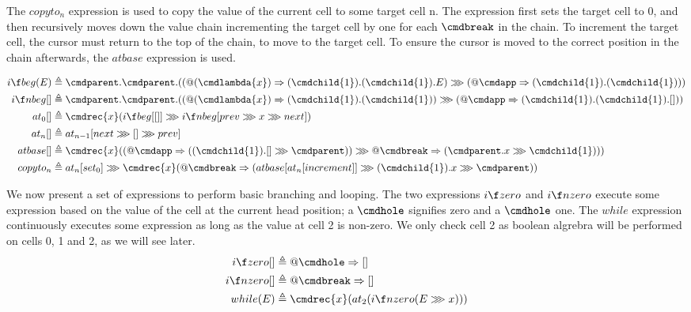 The $copyto_n$ expression is used to copy the value of the current cell to some target cell n. The expression first sets the target cell to 0, and then recursively moves down the value chain incrementing the target cell by one for each $\cmdbreak$ in the chain. To increment the target cell, the cursor must return to the top of the chain, to move to the target cell. To ensure the cursor is moved to the correct position in the chain afterwards, the $atbase$ expression is used.

\begin{align*}
    i\f beg(E) &\triangleq \cmdparent.\cmdparent.((@(\cmdlambda{x}) \Rightarrow (\cmdchild{1}).(\cmdchild{1}).E) \ggg (@\cmdapp \Rightarrow (\cmdchild{1}).(\cmdchild{1})))\\
    i\f nbeg[] &\triangleq \cmdparent.\cmdparent.((@(\cmdlambda{x}) \Rightarrow (\cmdchild{1}).(\cmdchild{1})) \ggg (@\cmdapp \Rightarrow (\cmdchild{1}).(\cmdchild{1}).[]))\\
    at_0[] &\triangleq \cmdrec{x}(i\f beg[[]] \ggg i\f nbeg[prev \ggg x \ggg next])\\
    at_n[] &\triangleq at_{n-1}[next \ggg [] \ggg prev]\\
    atbase[] &\triangleq \cmdrec{x}((@\cmdapp \Rightarrow ((\cmdchild{1}).[] \ggg \cmdparent)) \ggg @\cmdbreak \Rightarrow (\cmdparent.x \ggg \cmdchild{1})))\\
    copyto_n &\triangleq at_n[set_0] \ggg \cmdrec{x}(@\cmdbreak \Rightarrow (atbase[at_n[increment]] \ggg (\cmdchild{1}).x \ggg \cmdparent))\\
\end{align*}


We now present a set of expressions to perform basic branching and looping. The two expressions $i\f zero$ and $i\f nzero$ execute some expression based on the value of the cell at the current head position; a $\cmdhole$ signifies zero and a $\cmdhole$ one. The $while$ expression continuously executes some expression as long as the value at cell 2 is non-zero. We only check cell 2 as boolean algrebra will be performed on cells 0, 1 and 2, as we will see later.
\begin{align*}
    i\f zero[] &\triangleq @\cmdhole \Rightarrow []\\
    i\f nzero[] &\triangleq @\cmdbreak \Rightarrow []\\
    while(E) &\triangleq \cmdrec{x}(at_2(i\f nzero(E \ggg x)))
\end{align*}

